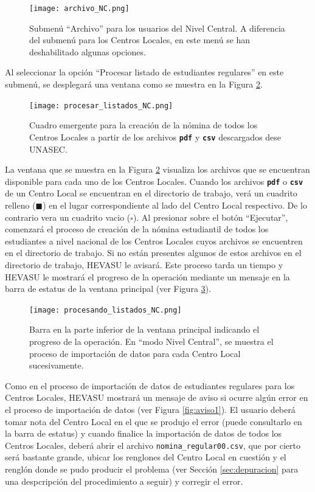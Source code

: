 \documentclass[letterpaper,12pt]{book}
\newcommand{\archivo}[1]
{\texttt{#1}}
\newcommand{\fileformat}[1]{\textbf{\texttt{#1}}}
\begin{document}
\begin{figure}[!ht]
  \centering
  \texttt{[image: archivo\_NC.png]}
  \caption{Submenú ``Archivo'' para los usuarios del Nivel Central. A diferencia del submenú para los Centros Locales, en este menú se han deshabilitado algunas opciones.}
  \label{fig:menuarchivo_NC}
\end{figure}

Al seleccionar la opción ``Procesar listado de estudiantes regulares'' en este submenú, se desplegará una ventana como se muestra en la Figura \ref{fig:procesarlistados_NC}.

\begin{figure}[!ht]
  \centering
  \texttt{[image: procesar\_listados\_NC.png]}
  \caption{Cuadro emergente para la creación de la nómina de todos los Centros Locales a partir de los archivos \fileformat{pdf} y \fileformat{csv} descargados dese UNASEC.}
  \label{fig:procesarlistados_NC}
\end{figure}

La ventana que se muestra en la Figura \ref{fig:procesarlistados_NC} visualiza los archivos que se encuentran disponible para cada uno de los Centros Locales. Cuando los archivos \fileformat{pdf} o \fileformat{csv} de un Centro Local se encuentran en el directorio de trabajo, verá un cuadrito relleno ($\blacksquare$) en el lugar correspondiente al lado del Centro Local respectivo. De lo contrario vera un cuadrito vacio ($\square$).  Al presionar sobre el botón ``Ejecutar'', comenzará el proceso de creación de la nómina estudiantil de todos los estudiantes a nivel nacional de los Centros Locales cuyos archivos se encuentren en el directorio de trabajo. Si no están presentes algunos de estos archivos en el directorio de trabajo, HEVASU le avisará. Este proceso tarda un tiempo y HEVASU le mostrará el progreso de la operación mediante un mensaje en la barra de estatus de la ventana principal (ver Figura \ref{fig:procesando_listados_NC}).

\begin{figure}[!ht]
  \centering
  \texttt{[image: procesando\_listados\_NC.png]}
  \caption{Barra en la parte inferior de la ventana principal indicando el progreso de la operación. En ``modo Nivel Central'', se muestra el proceso de importación de datos para cada Centro Local sucesivamente.}
  \label{fig:procesando_listados_NC}
\end{figure}

Como en el proceso de importación de datos de estudiantes regulares para los Centros Locales, HEVASU mostrará un mensaje de aviso si ocurre algún error en el proceso de importación de datos (ver Figura \ref{fig:aviso1}). El usuario deberá tomar nota del Centro Local en el que se produjo el error (puede consultarlo en la barra de estatus) y cuando finalice la importación de datos de todos los Centros Locales, deberá abrir el archivo \archivo{nomina\_regular00.csv}, que por cierto será bastante grande, ubicar los renglones del Centro Local en cuestión y el renglón donde se pudo producir el problema (ver Sección \ref{sec:depuracion} para una despcripción del procedimiento a seguir) y corregir el error.
\end{document}
